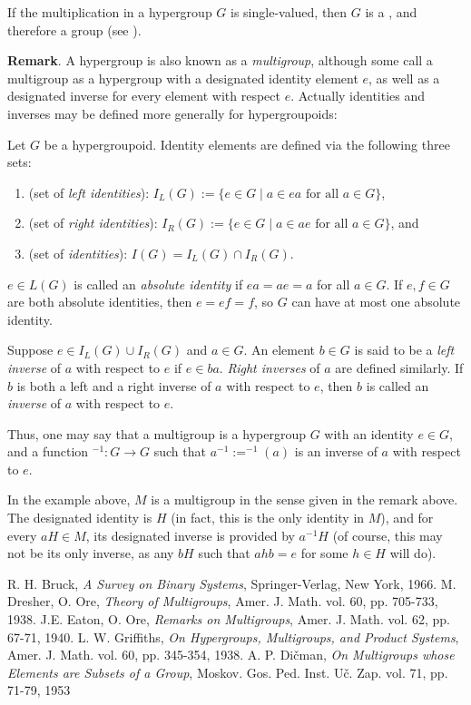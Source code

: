 \documentclass[12pt]{article}
\begin{document}
If the multiplication in a hypergroup $G$ is single-valued, then $G$ is a , and therefore a group (see ).

\textbf{Remark}.  A hypergroup is also known as a \emph{multigroup}, although some call a multigroup as a hypergroup with a designated identity element $e$, as well as a designated inverse for every element with respect $e$.  Actually identities and inverses may be defined more generally for hypergroupoids:

Let $G$ be a hypergroupoid.  Identity elements are defined via the following three sets:
\begin{enumerate}
\item (set of \emph{left identities}): $I_L(G):=\lbrace e\in G\mid a\in ea\mbox{ for all }a\in G\rbrace$,
\item (set of \emph{right identities}): $I_R(G):=\lbrace e\in G\mid a\in ae\mbox{ for all }a\in G\rbrace$, and 
\item (set of \emph{identities}): $I(G)=I_L(G)\cap I_R(G)$.  
\end{enumerate}
$e \in L(G)$ is called an \emph{absolute identity} if $ea=ae=a$ for all $a\in G$.  If $e,f\in G$ are both absolute identities, then $e = ef = f$, so $G$ can have at most one absolute identity.

Suppose $e\in I_L(G)\cup I_R(G)$ and $a\in G$.  An element $b\in G$ is said to be a \emph{left inverse} of $a$ with respect to $e$ if $e\in ba$.  \emph{Right inverses} of $a$ are defined similarly.  If $b$ is both a left and a right inverse of $a$ with respect to $e$, then $b$ is called an \emph{inverse} of $a$ with respect to $e$.

Thus, one may say that a multigroup is a hypergroup $G$ with an identity $e\in G$, and a function $^{-1}:G\to G$ such that $a^{-1}:=^{-1}(a)$ is an inverse of $a$ with respect to $e$.

In the example above, $M$ is a multigroup in the sense given in the remark above.  The designated identity is $H$ (in fact, this is the only identity in $M$), and for every $aH \in M$, its designated inverse is provided by $a^{-1}H$ (of course, this may not be its only inverse, as any $bH$ such that $ahb=e$ for some $h\in H$ will do).

\begin{thebibliography}{9}
 R. H. Bruck, \emph{A Survey on Binary Systems}, Springer-Verlag, New York, 1966.
 M. Dresher, O. Ore, \emph{Theory of Multigroups}, Amer. J. Math. vol. 60, pp. 705-733, 1938.
 J.E. Eaton, O. Ore, \emph{Remarks on Multigroups}, Amer. J. Math. vol. 62, pp. 67-71, 1940.
 L. W. Griffiths, \emph{On Hypergroups, Multigroups, and Product Systems}, Amer. J. Math. vol. 60, pp. 345-354, 1938.
 A. P. Di\v{c}man, \emph{On Multigroups whose Elements are Subsets of a Group}, Moskov. Gos. Ped. Inst. U\v{c}. Zap. vol. 71, pp. 71-79, 1953
\end{thebibliography}
\end{document}
